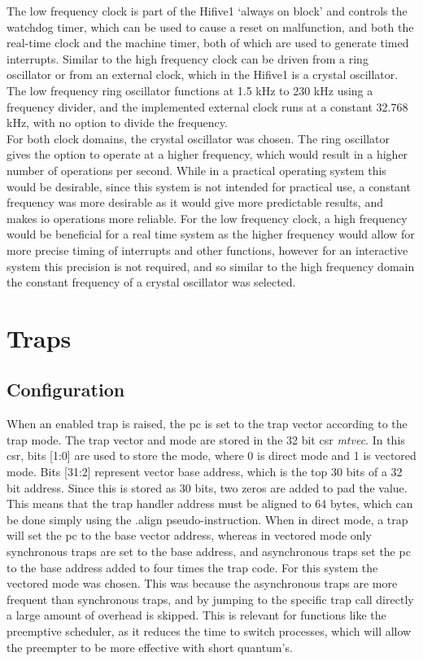 The low frequency clock is part of the Hifive1 `always on block' and controls the watchdog timer, which can be used to cause a reset on malfunction, and both the real-time clock and the machine timer, both of which are used to generate timed interrupts. Similar to the high frequency clock can be driven from a ring oscillator or from an external clock, which in the Hifive1 is a crystal oscillator. The low frequency ring oscillator functions at 1.5 kHz to 230 kHz using a frequency divider, and the implemented external clock runs at a constant 32.768 kHz, with no option to divide the frequency.
\\
For both clock domains, the crystal oscillator was chosen. The ring oscillator gives the option to operate at a higher frequency, which would result in a higher number of operations per second. While in a practical operating system this would be desirable, since this system is not intended for practical use, a constant frequency was more desirable as it would give more predictable results, and makes \ac{io} operations more reliable. For the low frequency clock, a high frequency would be beneficial for a real time system as the higher frequency would allow for more precise timing of interrupts and other functions, however for an interactive system this precision is not required, and so similar to the high frequency domain the constant frequency of a crystal oscillator was selected.
\section{Traps}
\subsection{Configuration}
When an enabled trap is raised, the pc is set to the trap vector according to the trap mode. The trap vector and mode are stored in the 32 bit csr \textit{mtvec}. In this csr, bits [1:0] are used to store the mode, where 0 is direct mode and 1 is vectored mode. Bits [31:2] represent vector base address, which is the top 30 bits of a 32 bit address. Since this is stored as 30 bits, two zeros are added to pad the value. This means that the trap handler address must be aligned to 64 bytes, which can be done simply using the .align pseudo-instruction. When in direct mode, a trap will set the pc to the base vector address, whereas in vectored mode only synchronous traps are set to the base address, and asynchronous traps set the pc to the base address added to four times the trap code. For this system the vectored mode was chosen. This was because the asynchronous traps are more frequent than synchronous traps, and by jumping to the specific trap call directly a large amount of overhead is skipped. This is relevant for functions like the preemptive scheduler, as it reduces the time to switch processes, which will allow the preempter to be more effective with short quantum's.

